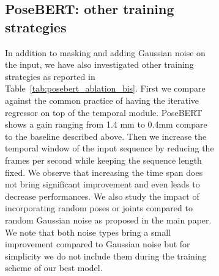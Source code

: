 \documentclass[10pt,twocolumn,letterpaper]{article}
\newcommand{\smpltransformer}{PoseBERT\xspace}
\newcommand{\posebert}{\smpltransformer}
\begin{document}
\begin{figure}
\begin{figure}
\subsection{\posebert: other training strategies}
\label{appsub:training}

In addition to masking and adding Gaussian noise on the input, we have also investigated other training strategies as reported in Table~\ref{tab:posebert_ablation_bis}.
First we compare against the common practice of having the iterative regressor \cite{thmmr} on top of the temporal module.
\posebert shows a gain ranging from 1.4 mm to 0.4mm compare to the baseline described above.
Then we increase the temporal window of the input sequence by reducing the frames per second while keeping the sequence length fixed.
We observe that increasing the time span does not bring significant improvement and even leads to decrease performances.
We also study the impact of incorporating random poses or joints compared to random Gaussian noise as proposed in the main paper.
We note that both noise types bring a small improvement compared to Gaussian noise but for simplicity we do not include them during the training scheme of our best model.





\end{figure}
\end{figure}
\end{document}

